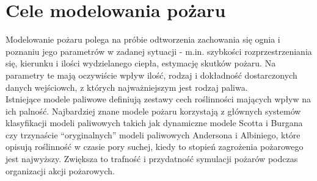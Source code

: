 \documentclass[a4paper, 11pt]{article}
\begin{document}
	\section*{Cele modelowania pożaru}
	\indent
	Modelowanie pożaru polega na próbie odtworzenia zachowania się ognia i poznaniu jego parametrów w zadanej sytuacji - m.in. szybkości rozprzestrzeniania się, kierunku i ilości wydzielanego ciepła, estymację skutków pożaru. Na parametry te mają oczywiście wpływ ilość, rodzaj i dokładność dostarczonych danych wejściowch, z których najważniejszym jest rodzaj paliwa. \\
	\indent Istniejące modele paliwowe definiują zestawy cech roślinności mających wpływ na ich palność. Najbardziej znane modele pożaru korzystają z głównych systemów klasyfikacji modeli paliwowych takich jak dynamiczne modele Scotta i Burgana czy trzynaście ``oryginalnych'' modeli paliwowych Andersona i Albiniego, które opisują roślinność w czasie pory suchej, kiedy to stopień zagrożenia pożarowego jest najwyższy. Zwiększa to trafność i przydatność symulacji pożarów podczas organizacji akcji pożarowych.
	
	
	
	
	
	
	
	
	
\end{document}
